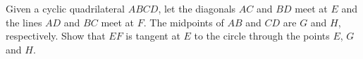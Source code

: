 Given a cyclic quadrilateral $ABCD$,  let the diagonals $AC$ and $BD$ meet at $E$ and the lines $AD$ and $BC$ meet at $F$. The midpoints of $AB$ and $CD$ are $G$ and $H$,  respectively. Show that $EF$ is tangent at $E$ to the circle through the points $E$,  $G$ and $H$.